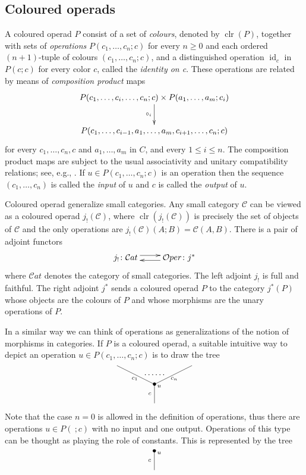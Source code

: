 \documentclass[a4paper]{amsart}
\theoremstyle{plain}
\theoremstyle{definition}
\theoremstyle{remark}
\DeclareMathOperator{\clr}{clr}
\DeclareMathOperator{\id}{id}
\newcommand{\Oper}{\mathcal{O}per}
\numberwithin{equation}{section}
\numberwithin{figure}{section}
\begin{document}
\subsection{Coloured operads}
A coloured operad $P$ consist of a set of \emph{colours}, denoted by
$\clr(P)$, together with sets of \emph{operations}
$P(c_1,\ldots,c_n;c)$ for every $n\ge 0$ and each ordered
$(n+1)$-tuple of colours $(c_1,\ldots, c_n; c)$, and a distinguished
operation $\id_c$ in $P(c;c)$ for every color $c$, called the
\emph{identity on c}. These operations are related by means of
\emph{composition product} maps
$$
\xymatrix{P(c_1,\ldots, c_i,\ldots,c_n;c)\times P(a_1,\ldots,a_m;c_i)\ar[d]_-{\circ_i}\\
P(c_1,\ldots, c_{i-1},a_1,\ldots,a_m,c_{i+1},\ldots,c_n;c)}
$$
for every $c_1, \ldots, c_n, c$ and $a_1,\ldots, a_m$ in $C$, and every $1\leq i\leq n$. The composition product
maps are subject to the usual associativity and unitary compatibility relations; see, e.g., \cite{leinster}.
If $u\in P(c_1,\ldots,c_n;c)$ is an operation then the sequence $(c_1,\ldots,c_n)$ is called the
\emph{input} of $u$ and $c$ is called the \emph{output} of $u$.

Coloured operad generalize small categories. Any small category
$\mathcal{C}$ can be viewed as a coloured operad
$j_!(\mathcal{C})$, where $\clr(j_!(\mathcal{C}))$
is precisely the set of objects of $\mathcal{C}$ and the only
operations are $j_!(\mathcal C)(A;B)=\mathcal{C}(A,B)$. There is a pair of
adjoint functors
$$
\xymatrix{
j_!\colon \mathcal{C}at \ar@<3pt>[r] & \ar@<3pt>[l] \Oper\colon j^*
}
$$
where $\mathcal{C}at$ denotes the category of small categories. The left
adjoint $j_!$ is full and faithful. The right adjoint $j^*$ sends a
coloured operad $P$ to the category $j^*(P)$ whose objects are the
colours of $P$ and whose morphisms are the unary operations of $P$.

In a similar way we can think of operations as generalizations of the
notion of morphisms in categories. If $P$ is a coloured
operad, a suitable intuitive way to depict an operation
$u\in P(c_1,\ldots, c_n;c)$ is to draw the tree
$$
\xy<0.08cm, 0cm>:
(0,0)*{}="1";
(0,10)*=0{\bullet}="2";
(-20,20)*{}="3";
(20,20)*{}="4";
"1";"2" **\dir{-};
"2";"3" **\dir{-};
"2";"4" **\dir{-};
(-2.5,5)*=0{\scriptstyle c};
(-10.5, 13)*=0{\scriptstyle c_1};
(10.5, 13)*=0{\scriptstyle c_n};
(2.5, 9)*=0{\scriptstyle u};
(0, 15)*=0{\cdots\cdots};
\endxy
$$
Note that the case $n=0$ is allowed in the definition of operations,
thus there are operations $u\in P(\ ;c)$ with no input and one
output. Operations of this type can be thought as playing the role
of constants. This is represented by the tree
$$
\xy<0.08cm, 0cm>:
(0,0)*{}="1";
(0,10)*=0{\bullet}="2";
"1";"2" **\dir{-};
(-2.5,5)*=0{\scriptstyle c};
(2.5, 9)*=0{\scriptstyle u};
\endxy
$$
\end{document}
